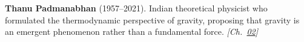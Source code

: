 \textbf{Thanu Padmanabhan} (1957–2021). Indian theoretical physicist who formulated the thermodynamic perspective of gravity, proposing that gravity is an emergent phenomenon rather than a fundamental force. \emph{[Ch.~\hyperref[ch:acceleratinguniverse]{02}]}

